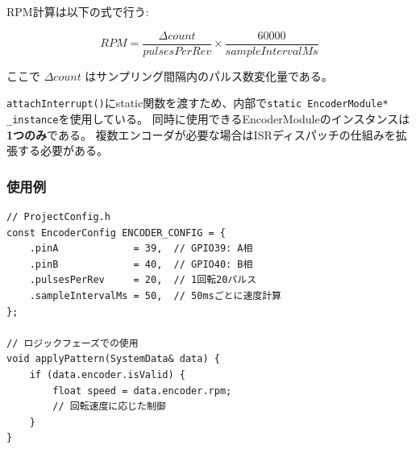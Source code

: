 \begin{notebox}[RPM計算式]
RPM計算は以下の式で行う:

\vspace{0.3em}
$$RPM = \frac{\Delta count}{pulsesPerRev} \times \frac{60000}{sampleIntervalMs}$$
\vspace{0.3em}

\noindent ここで $\Delta count$ はサンプリング間隔内のパルス数変化量である。
\end{notebox}

\begin{cautionbox}[シングルインスタンス制約]
\texttt{attachInterrupt()}にstatic関数を渡すため、内部で\texttt{static EncoderModule* \_instance}を使用している。
同時に使用できるEncoderModuleのインスタンスは\textbf{1つのみ}である。
複数エンコーダが必要な場合はISRディスパッチの仕組みを拡張する必要がある。
\end{cautionbox}

\subsubsection{使用例}

\begin{lstlisting}[style=cppstyle, caption={EncoderModuleの使用例}]
// ProjectConfig.h
const EncoderConfig ENCODER_CONFIG = {
    .pinA             = 39,  // GPIO39: A相
    .pinB             = 40,  // GPIO40: B相
    .pulsesPerRev     = 20,  // 1回転20パルス
    .sampleIntervalMs = 50,  // 50msごとに速度計算
};

// ロジックフェーズでの使用
void applyPattern(SystemData& data) {
    if (data.encoder.isValid) {
        float speed = data.encoder.rpm;
        // 回転速度に応じた制御
    }
}
\end{lstlisting}
